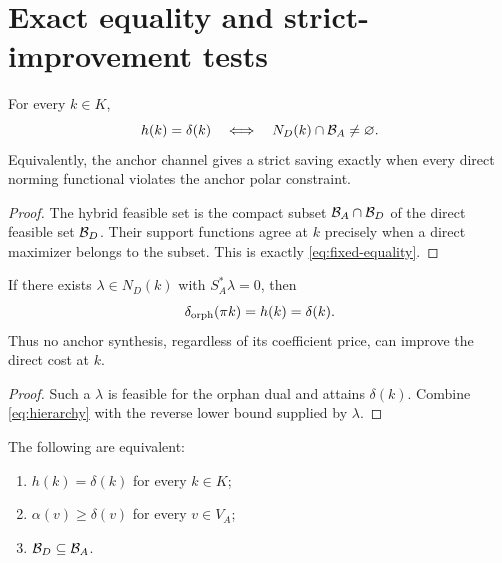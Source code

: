 \section{Exact equality and strict-improvement tests}
\label{sec:equality}

\begin{theorem}\label{thm:fixed-equality}
For every \(k\in K\),
\begin{equation}\label{eq:fixed-equality}
 h(k)=\delta(k)
 \quad\Longleftrightarrow\quad
 N_D(k)\cap\mathcal B_A\ne\varnothing.
\end{equation}
Equivalently, the anchor channel gives a strict saving exactly when
every direct norming functional violates the anchor polar constraint.
\end{theorem}

\begin{proof}
The hybrid feasible set is the compact subset
\(\mathcal B_A\cap\mathcal B_D\) of the direct feasible set \(\mathcal B_D\).  Their support
functions agree at \(k\) precisely when a direct maximizer belongs to
the subset.  This is exactly \eqref{eq:fixed-equality}.
\end{proof}

\begin{corollary}\label{cor:orphan-norming}
If there exists \(\lambda\in N_D(k)\) with
\(S_A^*\lambda=0\), then
\[
 \delta_{\rm orph}(\pi k)=h(k)=\delta(k).
\]
Thus no anchor synthesis, regardless of its coefficient price, can
improve the direct cost at \(k\).
\end{corollary}

\begin{proof}
Such a \(\lambda\) is feasible for the orphan dual and attains
\(\delta(k)\).  Combine \eqref{eq:hierarchy} with the reverse lower
bound supplied by \(\lambda\).
\end{proof}

\begin{theorem}\label{thm:global-redundancy}
The following are equivalent:
\begin{enumerate}[label=(\roman*),leftmargin=2.4em]
\item \(h(k)=\delta(k)\) for every \(k\in K\);
\item \(\alpha(v)\ge\delta(v)\) for every \(v\in V_A\);
\item \(\mathcal B_D\subseteq\mathcal B_A\).
\end{enumerate}
\end{theorem}

